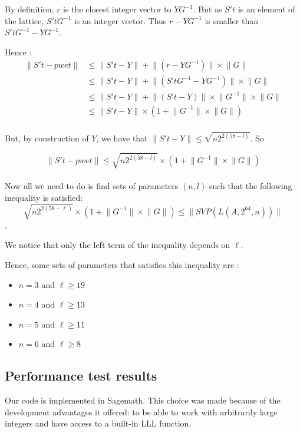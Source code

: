 \documentclass[preprint]{iacrtrans}
\begin{document}
By definition, \(r\) is the closest integer vector to \(YG^{-1}\). But as \(S't\) is an element of the lattice, \(S'tG^{-1}\) is an integer vector. Thus \(r-YG^{-1}\) is smaller than \(S'tG^{-1}-YG^{-1}\).

Hence :
\begin{align*}
\lVert S't - pwet \rVert &\leqslant \lVert S't - Y \rVert + \lVert(r-YG^{-1})\rVert \times \lVert G\rVert\\	
&\leqslant \lVert S't - Y \rVert + \lVert(S'tG^{-1}-YG^{-1})\rVert \times \lVert G\rVert\\	
&\leqslant \lVert S't - Y \rVert + \lVert(S't-Y)\rVert \times \lVert G^{-1} \rVert  \times \lVert G\rVert\\
& 	\leqslant \lVert S't - Y \rVert \times (1 +\lVert G^{-1} \rVert  \times \lVert G\rVert )\\
\end{align*}

But, by construction of \(Y\), we have that \(\lVert S't - Y \rVert \leqslant \sqrt{n2^{2(58-l)}} \). So

\[ \lVert S't - pwet \rVert \leqslant \sqrt{n2^{2(58-l)}}\times (1 +\lVert G^{-1} \rVert  \times \lVert G\rVert )\]\\




Now all we need to do is find sets of parameters \((n,l)\) such that the following inequality is satisfied: 
\[\sqrt{n2^{2(58-\ell)}} \times (1 +\lVert G^{-1} \rVert  \times \lVert G\rVert) \leqslant \lVert SVP(L(A,2^{64},n))\rVert \].

We notice that only the left term of the inequality depends on \(\ell\).

Hence, some sets of parameters that satisfies this inequality are :
\begin{itemize}
	\item \(n = 3\) and \(\ell \geqslant 19\)
	\item \(n = 4\) and \(\ell \geqslant 13\)
	\item \(n = 5\) and \(\ell \geqslant 11\)
	\item \(n = 6\) and \(\ell \geqslant 8\)
\end{itemize}
                
\subsection{Performance test results}
Our code is implemented in Sagemath. This choice was made because of the development advantages it offered: to be able to work with arbitrarily large integers and have access to a built-in LLL function.\\
\end{document}
